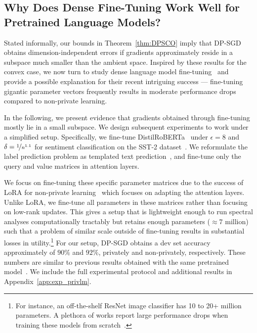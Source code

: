 \subsection{Why Does Dense Fine-Tuning Work Well for Pretrained Language Models?}\label{sec:lm}
Stated informally, our bounds in Theorem~\ref{thm:DPSCO} imply that DP-SGD obtains dimension-independent errors if gradients approximately reside in a subspace much smaller than the ambient space.
Inspired by these results for the convex case, we now turn to study dense language model fine-tuning~\cite{li2021large} and provide a possible explanation for their recent intriguing success --- fine-tuning gigantic parameter vectors frequently results in moderate performance drops compared to non-private learning.


In the following, we present evidence that gradients obtained through fine-tuning mostly lie in a small subspace.
We design subsequent experiments to work under a simplified setup. 
Specifically, we fine-tune DistilRoBERTa~\cite{sanh2019distilbert,liu2019roberta} under $\epsilon=8$ and $\delta = \nicefrac{1}{n^{1.1}}$ for sentiment classification on the SST-2 dataset~\cite{socher2013recursive}.
We reformulate the label prediction problem as templated text prediction~\cite{li2021large}, and fine-tune only the query and value matrices in attention layers.

We focus on fine-tuning these specific parameter matrices due to the success of LoRA for non-private learning~\cite{hu2021lora} which focuses on adapting the attention layers. Unlike LoRA, we fine-tune all parameters in these matrices rather than focusing on low-rank updates.
This gives a setup that is lightweight enough to run spectral analyses computationally tractably but retains enough parameters ($\approx7$ million) such that a problem of similar scale outside of fine-tuning results in substantial losses in utility.\footnote{For instance, an off-the-shelf ResNet image classifier has 10 to 20+ million parameters. A plethora of works report large performance drops when training these models from scratch~\cite{YZCL21,luo2021scalable,de2022unlocking}.}
For our setup, DP-SGD obtains a dev set accuracy approximately of $90\%$ and $92\%$, privately and non-privately, respectively.
These numbers are similar to previous results obtained with the same pretrained model~\cite{yu2021differentially,li2021large}. 
We include the full experimental protocol and additional results in Appendix~\ref{app:exp_privlm}.

